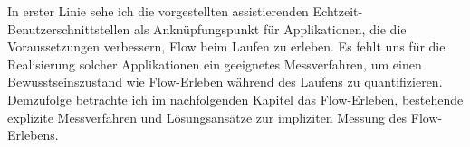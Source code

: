 In erster Linie sehe ich die vorgestellten assistierenden Echtzeit-Benutzerschnittstellen als Anknüpfungspunkt für Applikationen, die die Voraussetzungen verbessern, Flow beim Laufen zu erleben. Es fehlt uns für die Realisierung solcher Applikationen ein geeignetes Messverfahren, um einen Bewusstseinszustand wie Flow-Erleben während des Laufens zu quantifizieren. Demzufolge betrachte ich im nachfolgenden Kapitel das Flow-Erleben, bestehende explizite Messverfahren und Lösungsansätze zur impliziten Messung des Flow-Erlebens.